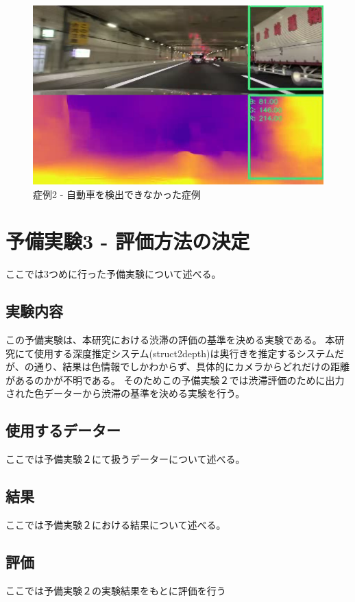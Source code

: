 \begin{figure}[hbtp]
 \begin{center}
  \includegraphics[width=12cm]{figs/miss_2.png}
 \end{center}
  \caption{症例2 - 自動車を検出できなかった症例}
  \label{fig:miss2}
\end{figure}

\newpage

\section{予備実験3 - 評価方法の決定}
ここでは3つめに行った予備実験について述べる。
\subsection{実験内容}
この予備実験は、本研究における渋滞の評価の基準を決める実験である。
本研究にて使用する深度推定システム(struct2depth)\cite{casser2019struct2depth}は奥行きを推定するシステムだが、の通り、結果は色情報でしかわからず、具体的にカメラからどれだけの距離があるのかが不明である。
そのためこの予備実験２では渋滞評価のために出力された色データーから渋滞の基準を決める実験を行う。

\subsection{使用するデーター}
ここでは予備実験２にて扱うデーターについて述べる。

\subsection{結果}
ここでは予備実験２における結果について述べる。

\subsection{評価}
ここでは予備実験２の実験結果をもとに評価を行う
